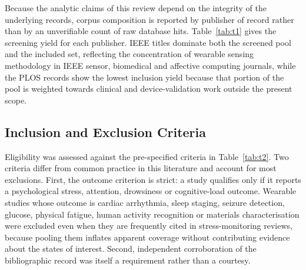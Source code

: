 Because the analytic claims of this review depend on the integrity of the underlying records,
corpus composition is reported by publisher of record rather than by an unverifiable count of
raw database hits. Table~\ref{tab:t1} gives the screening yield for each publisher. IEEE
titles dominate both the screened pool and the included set, reflecting the concentration of
wearable sensing methodology in IEEE sensor, biomedical and affective computing journals,
while the PLOS records show the lowest inclusion yield because that portion of the pool is
weighted towards clinical and device-validation work outside the present scope.

\begin{table}[!htbp]
\centering
\caption{Composition of the screened corpus and inclusion yield by publisher of record.
Inclusion yield is the proportion of screened records from that publisher that met all
eligibility criteria.}
\label{tab:t1}
\small
\resizebox{\textwidth}{!}{}
\end{table}

\subsection{Inclusion and Exclusion Criteria}
Eligibility was assessed against the pre-specified criteria in Table~\ref{tab:t2}. Two
criteria differ from common practice in this literature and account for most exclusions.
First, the outcome criterion is strict: a study qualifies only if it reports a psychological
stress, attention, drowsiness or cognitive-load outcome. Wearable studies whose outcome is
cardiac arrhythmia, sleep staging, seizure detection, glucose, physical fatigue, human
activity recognition or materials characterisation were excluded even when they are
frequently cited in stress-monitoring reviews, because pooling them inflates apparent
coverage without contributing evidence about the states of interest. Second, independent
corroboration of the bibliographic record was itself a requirement rather than a courtesy.

